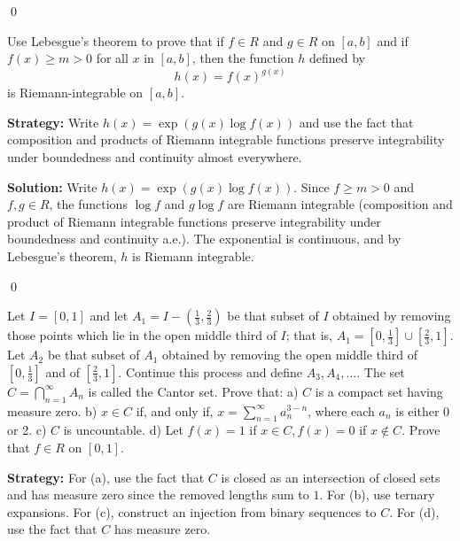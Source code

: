 \qed
\begin{problembox}
\begin{problemstatement}
Use Lebesgue's theorem to prove that if $f \in R$ and $g \in R$ on $[a, b]$ and if $f(x) \geq m > 0$ for all $x$ in $[a, b]$, then the function $h$ defined by
\[h(x) = f(x)^{g(x)}\]
is Riemann-integrable on $[a, b]$.
\end{problemstatement}
\end{problembox}

\noindent\textbf{Strategy:} Write $h(x) = \exp(g(x) \log f(x))$ and use the fact that composition and products of Riemann integrable functions preserve integrability under boundedness and continuity almost everywhere.

\bigskip\noindent\textbf{Solution:}
Write $h(x)=\exp(g(x)\log f(x))$. Since $f\ge m>0$ and $f,g\in R$, the functions $\log f$ and $g\log f$ are Riemann integrable (composition and product of Riemann integrable functions preserve integrability under boundedness and continuity a.e.). The exponential is continuous, and by Lebesgue's theorem, $h$ is Riemann integrable.




\qed
\begin{problembox}
\begin{problemstatement}
Let $I = [0, 1]$ and let $A_1 = I - (\frac{1}{3}, \frac{2}{3})$ be that subset of $I$ obtained by removing those points which lie in the open middle third of $I$; that is, $A_1 = [0, \frac{1}{3}] \cup [\frac{2}{3}, 1]$. Let $A_2$ be that subset of $A_1$ obtained by removing the open middle third of $[0, \frac{1}{3}]$ and of $[\frac{2}{3}, 1]$. Continue this process and define $A_3, A_4, \ldots$. The set $C = \bigcap_{n=1}^{\infty} A_n$ is called the Cantor set. Prove that:
a) $C$ is a compact set having measure zero.
b) $x \in C$ if, and only if, $x = \sum_{n=1}^{\infty} a_n^{3-n}$, where each $a_n$ is either 0 or 2.
c) $C$ is uncountable.
d) Let $f(x) = 1$ if $x \in C, f(x) = 0$ if $x \notin C$. Prove that $f \in R$ on $[0, 1]$.
\end{problemstatement}
\end{problembox}

\noindent\textbf{Strategy:} For (a), use the fact that $C$ is closed as an intersection of closed sets and has measure zero since the removed lengths sum to $1$. For (b), use ternary expansions. For (c), construct an injection from binary sequences to $C$. For (d), use the fact that $C$ has measure zero.

